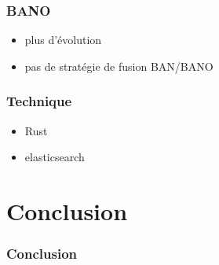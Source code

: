 \documentclass[table]{beamer}
\begin{document}
\begin{frame}
  \frametitle{BANO}

  \begin{itemize}
  \item plus d'évolution
  \item pas de stratégie de fusion BAN/BANO
  \end{itemize}
\end{frame}

\begin{frame}
  \frametitle{Technique}

  \begin{itemize}
  \item Rust
  \item elasticsearch
  \end{itemize}
\end{frame}

\section{Conclusion}

\begin{frame}
  \frametitle{Conclusion}

\end{frame}

\begin{frame}
  \titlepage
\end{frame}
\end{document}
